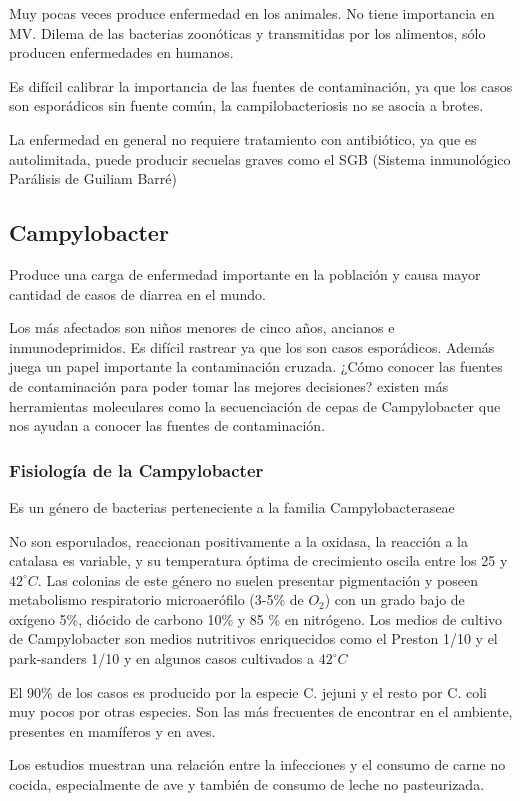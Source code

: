 Muy pocas veces produce enfermedad en los animales. No  tiene importancia en MV. Dilema de las bacterias zoonóticas y transmitidas por los alimentos, sólo producen enfermedades en humanos.

Es difícil calibrar la importancia de las fuentes de contaminación, ya que los casos son esporádicos sin fuente común, la campilobacteriosis no se asocia a brotes.

La enfermedad en general no requiere tratamiento con antibiótico, ya que es autolimitada, puede producir secuelas graves como el SGB (Sistema inmunológico Parálisis de Guiliam Barré)
\subsection{Campylobacter}
Produce una carga de enfermedad importante en la población y causa mayor cantidad de casos de diarrea en el mundo.

Los más afectados son niños menores de cinco años, ancianos e inmunodeprimidos. Es difícil rastrear ya que los son casos esporádicos. Además juega un papel importante la contaminación cruzada.
¿Cómo conocer las fuentes de contaminación para poder tomar las mejores decisiones? existen más herramientas moleculares como la secuenciación de cepas de Campylobacter que nos ayudan a conocer las fuentes de contaminación.
\subsubsection{Fisiología de la Campylobacter}
Es un género de bacterias perteneciente a la familia Campylobacteraseae

No son esporulados, reaccionan positivamente a la oxidasa, la reacción a la catalasa es variable, y su temperatura óptima de crecimiento oscila entre los 25 y $42^{\circ}C$. Las colonias de este género no suelen presentar pigmentación y poseen metabolismo respiratorio microaerófilo (3-5\% de $O_2$) con un grado bajo de oxígeno 5\%, diócido de carbono 10\% y 85 \% en nitrógeno. Los medios de cultivo de Campylobacter son medios nutritivos enriquecidos como el Preston 1/10 y el park-sanders 1/10 y en algunos casos cultivados a $42^{\circ}C$

El 90\% de los casos es producido por la especie C. jejuni y el resto por C. coli muy pocos por otras especies. Son las más frecuentes de encontrar en el ambiente, presentes en mamíferos y en aves. 

Los estudios muestran una relación entre la infecciones y el consumo de carne no cocida, especialmente de ave y también de consumo de leche no pasteurizada.
